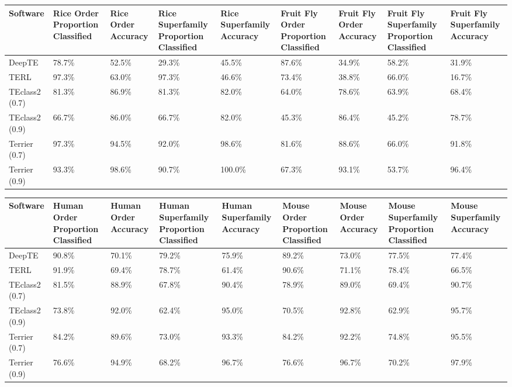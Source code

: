 \begin{tabular}{lllllllll}
\toprule
Software & Rice Order Proportion Classified & Rice Order Accuracy & Rice Superfamily Proportion Classified & Rice Superfamily Accuracy & Fruit Fly Order Proportion Classified & Fruit Fly Order Accuracy & Fruit Fly Superfamily Proportion Classified & Fruit Fly Superfamily Accuracy \\
\midrule
DeepTE & 78.7\% & 52.5\% & 29.3\% & 45.5\% & 87.6\% & 34.9\% & 58.2\% & 31.9\% \\
TERL & 97.3\% & 63.0\% & 97.3\% & 46.6\% & 73.4\% & 38.8\% & 66.0\% & 16.7\% \\
TEclass2 (0.7) & 81.3\% & 86.9\% & 81.3\% & 82.0\% & 64.0\% & 78.6\% & 63.9\% & 68.4\% \\
TEclass2 (0.9) & 66.7\% & 86.0\% & 66.7\% & 82.0\% & 45.3\% & 86.4\% & 45.2\% & 78.7\% \\
Terrier (0.7) & 97.3\% & 94.5\% & 92.0\% & 98.6\% & 81.6\% & 88.6\% & 66.0\% & 91.8\% \\
Terrier (0.9) & 93.3\% & 98.6\% & 90.7\% & 100.0\% & 67.3\% & 93.1\% & 53.7\% & 96.4\% \\
\bottomrule
\end{tabular}


\begin{tabular}{lllllllll}
\toprule
Software & Human Order Proportion Classified & Human Order Accuracy & Human Superfamily Proportion Classified & Human Superfamily Accuracy & Mouse Order Proportion Classified & Mouse Order Accuracy & Mouse Superfamily Proportion Classified & Mouse Superfamily Accuracy \\
\midrule
DeepTE & 90.8\% & 70.1\% & 79.2\% & 75.9\% & 89.2\% & 73.0\% & 77.5\% & 77.4\% \\
TERL & 91.9\% & 69.4\% & 78.7\% & 61.4\% & 90.6\% & 71.1\% & 78.4\% & 66.5\% \\
TEclass2 (0.7) & 81.5\% & 88.9\% & 67.8\% & 90.4\% & 78.9\% & 89.0\% & 69.4\% & 90.7\% \\
TEclass2 (0.9) & 73.8\% & 92.0\% & 62.4\% & 95.0\% & 70.5\% & 92.8\% & 62.9\% & 95.7\% \\
Terrier (0.7) & 84.2\% & 89.6\% & 73.0\% & 93.3\% & 84.2\% & 92.2\% & 74.8\% & 95.5\% \\
Terrier (0.9) & 76.6\% & 94.9\% & 68.2\% & 96.7\% & 76.6\% & 96.7\% & 70.2\% & 97.9\% \\
\bottomrule
\end{tabular}
